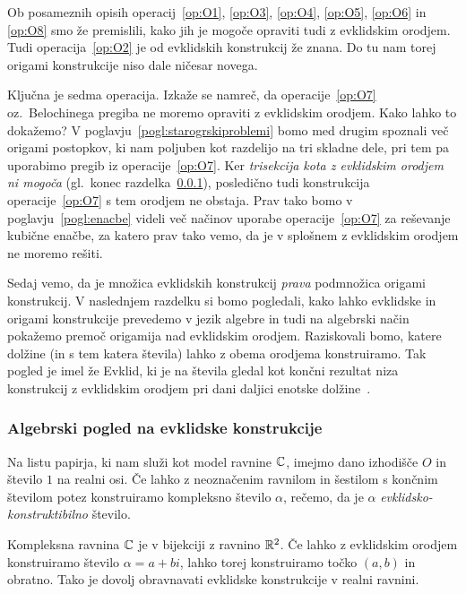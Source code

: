 Ob posameznih opisih operacij~\ref{op:O1}, \ref{op:O3}, \ref{op:O4}, \ref{op:O5}, \ref{op:O6} in \ref{op:O8} smo že premislili, kako  jih je mogoče opraviti tudi z evklidskim orodjem. Tudi operacija~\ref{op:O2} je od evklidskih konstrukcij že znana. Do tu nam torej origami konstrukcije niso dale ničesar novega.

Ključna je sedma operacija. Izkaže se namreč, da operacije~\ref{op:O7} oz.\ Belochinega pregiba ne moremo opraviti z evklidskim orodjem. Kako lahko to dokažemo? V poglavju~\ref{pogl:starogrskiproblemi} bomo med drugim spoznali več origami postopkov, ki nam poljuben kot razdelijo na tri skladne dele, pri tem pa uporabimo pregib iz operacije~\ref{op:O7}. Ker \emph{trisekcija kota z evklidskim orodjem ni mogoča} (gl.\ konec razdelka~\ref{podpogl:evkl_konstruktibilnost}), posledično tudi konstrukcija operacije~\ref{op:O7} s tem orodjem ne obstaja. Prav tako bomo v poglavju~\ref{pogl:enacbe} videli več načinov uporabe operacije~\ref{op:O7} za reševanje kubične enačbe, za katero prav tako vemo, da je v splošnem z evklidskim orodjem ne moremo rešiti.

Sedaj vemo, da je množica evklidskih konstrukcij \emph{prava} podmnožica origami konstrukcij. V naslednjem razdelku si bomo pogledali, kako lahko evklidske in origami konstrukcije prevedemo v jezik algebre in tudi na algebrski način pokažemo premoč origamija nad evklidskim orodjem. Raziskovali bomo, katere dolžine (in s tem katera števila) lahko z obema orodjema konstruiramo. Tak pogled je imel že Evklid, ki je na števila gledal kot končni rezultat niza konstrukcij z evklidskim orodjem pri dani daljici enotske dolžine~\cite[str. 164]{michael2005}.

\subsubsection{Algebrski pogled na evklidske konstrukcije}
\label{podpogl:evkl_konstruktibilnost}

\begin{definicija}
    \label{def:evkl_konstr}
    Na listu papirja, ki nam služi kot model ravnine $\mathbb C$, imejmo dano izhodišče $O$ in število $1$ na realni osi. Če lahko z neoznačenim ravnilom in šestilom s končnim številom potez konstruiramo kompleksno število $\alpha$, rečemo, da je $\alpha$ \emph{evklidsko-konstruktibilno} število.
\end{definicija}

Kompleksna ravnina $\mathbb C$ je v bijekciji z ravnino $\mathbb R^2$. Če lahko z evklidskim orodjem konstruiramo število $\alpha = a + bi$, lahko torej konstruiramo točko $(a, b)$ in obratno. Tako je dovolj obravnavati evklidske konstrukcije v realni ravnini.

